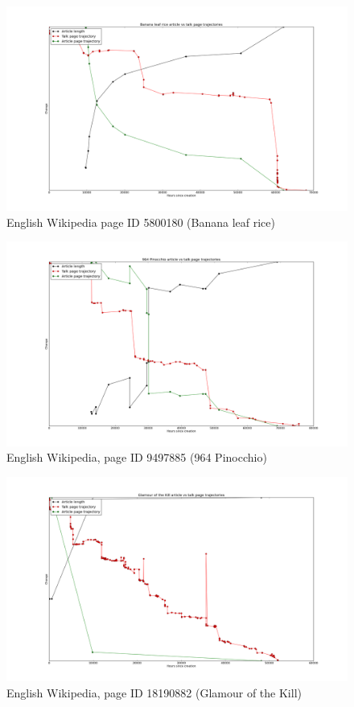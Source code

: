 \begin{figure}
  \centering
  \includegraphics[width=\linewidth]{img/specialcombo/en5800180.png}
  \caption{English Wikipedia page ID 5800180 (Banana leaf rice)}
\end{figure}
\begin{figure}
  \centering
  \includegraphics[width=\linewidth]{img/specialcombo/en9497885.png}
  \caption{English Wikipedia, page ID 9497885 (964 Pinocchio)}
\end{figure}
\begin{figure}
  \centering
  \includegraphics[width=\linewidth]{img/specialcombo/en18190882.png}
  \caption{English Wikipedia, page ID 18190882 (Glamour of the Kill)}
\end{figure}
